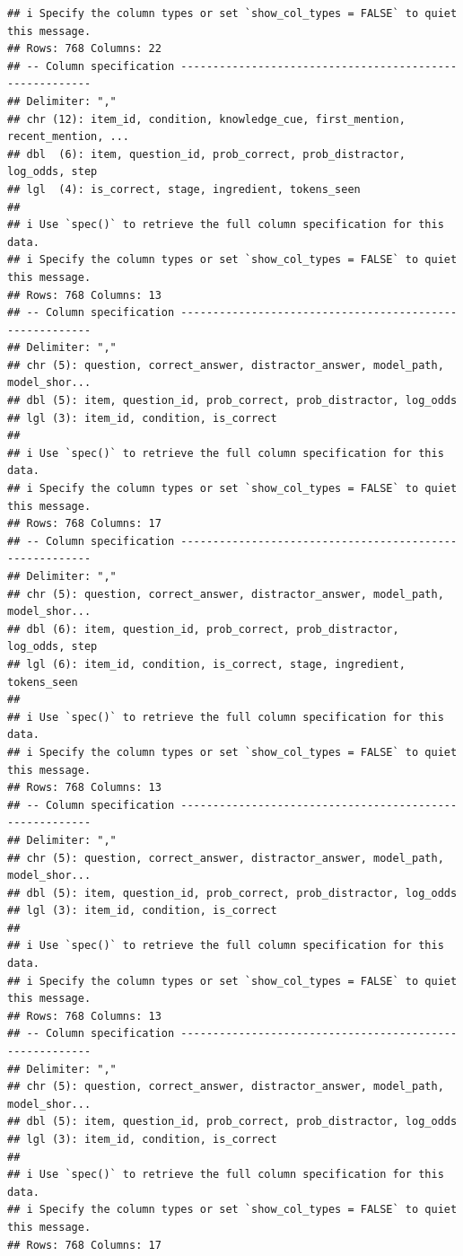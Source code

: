 \documentclass[
]{article}
\begin{document}
\begin{verbatim}
## i Specify the column types or set `show_col_types = FALSE` to quiet this message.
## Rows: 768 Columns: 22
## -- Column specification --------------------------------------------------------
## Delimiter: ","
## chr (12): item_id, condition, knowledge_cue, first_mention, recent_mention, ...
## dbl  (6): item, question_id, prob_correct, prob_distractor, log_odds, step
## lgl  (4): is_correct, stage, ingredient, tokens_seen
## 
## i Use `spec()` to retrieve the full column specification for this data.
## i Specify the column types or set `show_col_types = FALSE` to quiet this message.
## Rows: 768 Columns: 13
## -- Column specification --------------------------------------------------------
## Delimiter: ","
## chr (5): question, correct_answer, distractor_answer, model_path, model_shor...
## dbl (5): item, question_id, prob_correct, prob_distractor, log_odds
## lgl (3): item_id, condition, is_correct
## 
## i Use `spec()` to retrieve the full column specification for this data.
## i Specify the column types or set `show_col_types = FALSE` to quiet this message.
## Rows: 768 Columns: 17
## -- Column specification --------------------------------------------------------
## Delimiter: ","
## chr (5): question, correct_answer, distractor_answer, model_path, model_shor...
## dbl (6): item, question_id, prob_correct, prob_distractor, log_odds, step
## lgl (6): item_id, condition, is_correct, stage, ingredient, tokens_seen
## 
## i Use `spec()` to retrieve the full column specification for this data.
## i Specify the column types or set `show_col_types = FALSE` to quiet this message.
## Rows: 768 Columns: 13
## -- Column specification --------------------------------------------------------
## Delimiter: ","
## chr (5): question, correct_answer, distractor_answer, model_path, model_shor...
## dbl (5): item, question_id, prob_correct, prob_distractor, log_odds
## lgl (3): item_id, condition, is_correct
## 
## i Use `spec()` to retrieve the full column specification for this data.
## i Specify the column types or set `show_col_types = FALSE` to quiet this message.
## Rows: 768 Columns: 13
## -- Column specification --------------------------------------------------------
## Delimiter: ","
## chr (5): question, correct_answer, distractor_answer, model_path, model_shor...
## dbl (5): item, question_id, prob_correct, prob_distractor, log_odds
## lgl (3): item_id, condition, is_correct
## 
## i Use `spec()` to retrieve the full column specification for this data.
## i Specify the column types or set `show_col_types = FALSE` to quiet this message.
## Rows: 768 Columns: 17

\end{verbatim}
\end{document}
